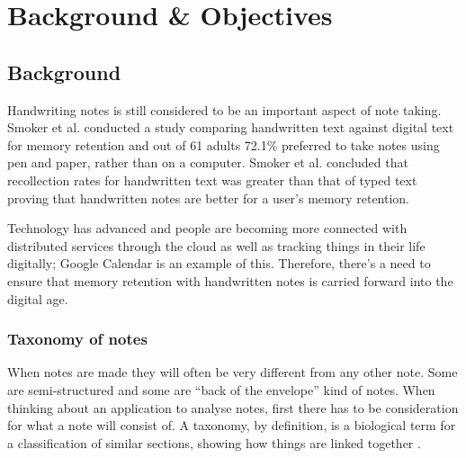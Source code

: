 \chapter{Background \& Objectives}






\section{Background}
Handwriting notes is still considered to be an important aspect of note taking. Smoker et al. \cite{citeulike:13988059} conducted a study comparing handwritten text against digital text for memory retention and out of 61 adults 72.1\% preferred to take notes using pen and paper, rather than on a computer. Smoker et al. concluded that recollection rates for handwritten text was greater than that of typed text proving that handwritten notes are better for a user's memory retention.

Technology has advanced and people are becoming more connected with distributed services through the cloud as well as tracking things in their life digitally; Google Calendar is an example of this. Therefore, there's a need to ensure that memory retention with handwritten notes is carried forward into the digital age.


\subsection{Taxonomy of notes}
When notes are made they will often be very different from any other note. Some are semi-structured and some are ``back of the envelope'' kind of notes. When thinking about an application to analyse notes, first there has to be consideration for what a note will consist of. A taxonomy, by definition, is a biological term for a classification of similar sections, showing how things are linked together \cite{citeulike:Taxonomy}.

